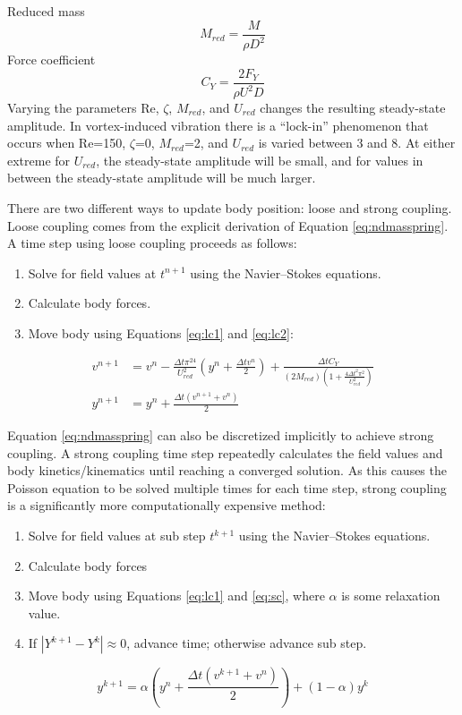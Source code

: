 \documentclass[preprint,12pt,5p]{elsarticle}
\begin{document}
Reduced mass
\begin{equation}
M_{red}=\frac{M}{\rho D^2}\label{eq:reduced mass}
\end{equation}
Force coefficient
\begin{equation}
C_Y=\frac{2F_Y}{\rho U^2 D}\label{eq:force coefficient}
\end{equation}
Varying the parameters Re, $\zeta$, $M_{red}$, and $U_{red}$ changes the resulting steady-state amplitude. 
In vortex-induced vibration there is a ``lock-in'' phenomenon that occurs when Re=150, $\zeta$=0, $M_{red}$=2, and $U_{red}$ is varied between 3 and 8. 
At either extreme for $U_{red}$, the steady-state amplitude will be small, and for values in between the steady-state amplitude will be much larger. 

There are two different ways to update body position: loose and strong coupling. 
Loose coupling comes from the explicit derivation of Equation \eqref{eq:ndmasspring}.
A time step using loose coupling proceeds as follows:
\begin{enumerate}
	\item Solve for field values at $t^{n+1}$ using the Navier--Stokes equations.
	\item Calculate body forces.
	\item Move body using Equations \eqref{eq:lc1} and \eqref{eq:lc2}:
\end{enumerate}
\begin{align}
v^{n+1} &= v^n-\frac{\Delta t\pi^24}{U_{red}^2}\left(y^n+\frac{\Delta tv^n}{2}\right) + \frac{\Delta tC_Y}{\left(2M_{red}\right)\left(1+\frac{4\Delta t^2\pi^2}{U_{red}^2}\right)} \label{eq:lc1} \\
y^{n+1} &= y^n +\frac{\Delta t\left(v^{n+1}+v^n\right)}{2}\; \label{eq:lc2}
\end{align}

Equation \eqref{eq:ndmasspring} can also be discretized implicitly to achieve strong coupling.
A strong coupling time step repeatedly calculates the field values and body kinetics/kinematics until reaching a converged solution.
As this causes the Poisson equation to be solved multiple times for each time step, strong coupling is a significantly more computationally expensive method:
\begin{enumerate}
	\item Solve for field values at sub step $t^{k+1}$ using the Navier--Stokes equations.
	\item Calculate body forces
	\item Move body using Equations \eqref{eq:lc1} and \eqref{eq:sc}, where $\alpha$ is some relaxation value.
	\item If $|Y^{k+1}-Y^k| \approx 0$, advance time; otherwise advance sub step.
\end{enumerate}
\begin{equation}
y^{k+1} = \alpha \left(y^n+\frac{\Delta t\left(v^{k+1}+v^n\right)}{2}\right) +\left(1-\alpha\right)y^k\label{eq:sc}
\end{equation}
\end{document}
